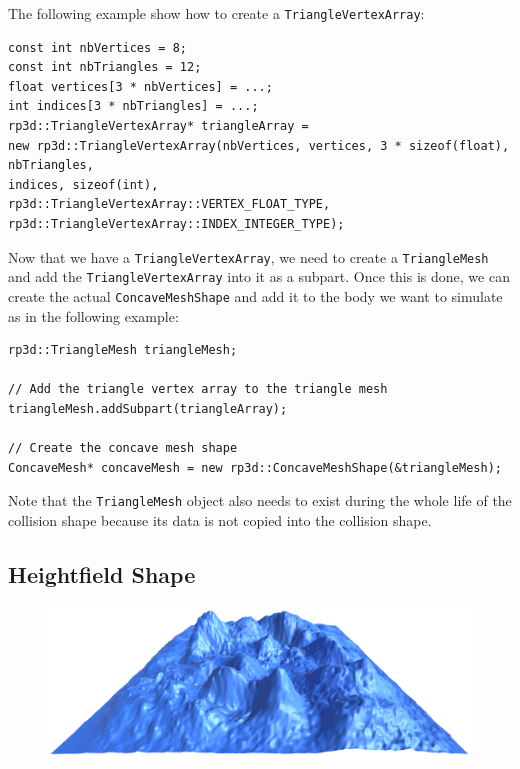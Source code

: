 \documentclass[a4paper,12pt]{article}
\begin{document}
  The following example show how to create a \texttt{TriangleVertexArray}: \\

  \begin{lstlisting}
const int nbVertices = 8;
const int nbTriangles = 12;
float vertices[3 * nbVertices] = ...;
int indices[3 * nbTriangles] = ...;
rp3d::TriangleVertexArray* triangleArray =
new rp3d::TriangleVertexArray(nbVertices, vertices, 3 * sizeof(float), nbTriangles,
indices, sizeof(int),
rp3d::TriangleVertexArray::VERTEX_FLOAT_TYPE,
rp3d::TriangleVertexArray::INDEX_INTEGER_TYPE);
  \end{lstlisting}

  \vspace{0.6cm}

  Now that we have a \texttt{TriangleVertexArray}, we need to create a \texttt{TriangleMesh} and add the \texttt{TriangleVertexArray}
  into it as a subpart. Once this is done, we can create the actual \texttt{ConcaveMeshShape} and add it to the body we want to
  simulate as in the following example: \\

  \begin{lstlisting}
rp3d::TriangleMesh triangleMesh;

// Add the triangle vertex array to the triangle mesh
triangleMesh.addSubpart(triangleArray);

// Create the concave mesh shape
ConcaveMesh* concaveMesh = new rp3d::ConcaveMeshShape(&triangleMesh);
  \end{lstlisting}

  \vspace{0.6cm}

  Note that the \texttt{TriangleMesh} object also needs to exist during the whole life of the collision shape because its
  data is not copied into the collision shape.

  \subsection{Heightfield Shape}

  \begin{figure}[h]
      \centering
      \includegraphics{heightfieldshape.png}
      \label{fig:heightfieldshape}
  \end{figure}
\end{document}
